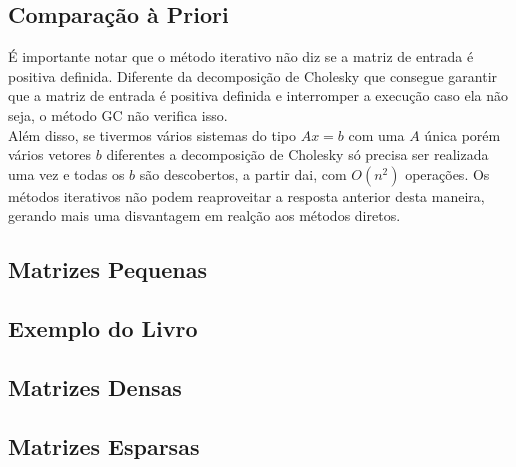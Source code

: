 \documentclass[
10pt, %
a4paper, %
oneside, %
headinclude,footinclude, %
BCOR5mm, %
]{scrartcl}
\begin{document}
\subsection{Comparação à Priori}
É importante notar que o método iterativo não diz se a matriz de entrada é positiva definida. Diferente da decomposição de Cholesky que consegue garantir que a matriz de entrada é positiva definida e interromper a execução caso ela não seja, o método GC não verifica isso. \\
Além disso, se tivermos vários sistemas do tipo $Ax = b$ com uma $A$ única porém vários vetores $b$ diferentes a decomposição de Cholesky só precisa ser realizada uma vez e todas os $b$ são descobertos, a partir dai, com $O(n^2)$ operações. Os métodos iterativos não podem reaproveitar a resposta anterior desta maneira, gerando mais uma disvantagem em realção aos métodos diretos. \\

\subsection{Matrizes Pequenas}
\subsection{Exemplo do Livro}
\subsection{Matrizes Densas}
\subsection{Matrizes Esparsas}


\renewcommand{\refname}{\spacedlowsmallcaps{Bibliografia}} %


\end{document}
